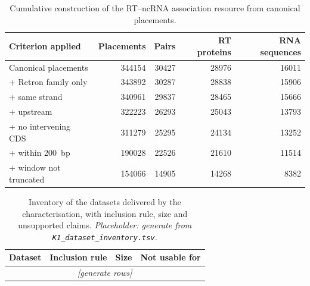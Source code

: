 \begin{table}[htbp]
\centering
\caption[Cumulative construction of the RT--ncRNA association resource]{Cumulative construction of
the RT--ncRNA association resource from canonical placements.}
\label{tab:cascade}
\begin{tabular}{lrrrr}
\toprule
Criterion applied & Placements & Pairs & RT proteins & RNA sequences \\
\midrule
Canonical placements        & \num{344154} & \num{30427} & \num{28976} & \num{16011} \\
\quad + Retron family only  & \num{343892} & \num{30287} & \num{28838} & \num{15906} \\
\quad + same strand         & \num{340961} & \num{29837} & \num{28465} & \num{15666} \\
\quad + upstream            & \num{322223} & \num{26293} & \num{25043} & \num{13793} \\
\quad + no intervening CDS  & \num{311279} & \num{25295} & \num{24134} & \num{13252} \\
\quad + within 200~bp       & \num{190028} & \num{22526} & \num{21610} & \num{11514} \\
\quad + window not truncated& \num{154066} & \num{14905} & \num{14268} & \num{8382}  \\
\bottomrule
\end{tabular}
\end{table}

\begin{table}[htbp]
\centering
\caption[Dataset inventory]{Inventory of the datasets delivered by the characterisation, with
inclusion rule, size and unsupported claims. \emph{Placeholder: generate from
\texttt{K1\_dataset\_inventory.tsv}.}}
\label{tab:inventory}
\begin{tabular}{p{}p{}rp{}}
\toprule
Dataset & Inclusion rule & Size & Not usable for \\
\midrule
\multicolumn{4}{c}{\emph{[generate rows]}} \\
\bottomrule
\end{tabular}
\end{table}


